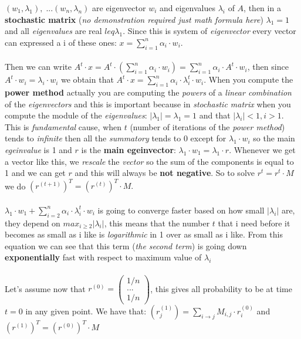 \documentclass{article}
\begin{document}
$(w_1, \lambda_1),\; ... (w_n, \lambda_n)$ are eigenvector $w_i$ and eigenvalues $\lambda_i$ of $A$, then in a \textbf{stochastic matrix} (\emph{no demonstration required just math formula here}) $\lambda_1 = 1$ and all \emph{eigenvalues} are real $leq \lambda_1$. Since this is system of \emph{eigenvector} every vector can expressed a i of these ones: $x = \sum_{i=1}^{n} \alpha_i \cdot w_i$. \\\\
Then we can write $A^t \cdot x = A^t \cdot (\sum_{i=1}^{n} \alpha_i \cdot w_i) = \sum_{i=1}^{n} \alpha_i \cdot A^t \cdot w_i$, then since $A^t \cdot w_i = \lambda_i \cdot w_i$ we obtain that $A^t \cdot x = \sum_{i=1}^{n} \alpha_i \cdot \lambda_i^t \cdot w_i$. When you compute the \textbf{power method} actually you are computing the \emph{powers} of a \emph{linear combination} of the \emph{eigenvectors} and this is important because in \emph{stochastic matrix} when you compute the module of the \emph{eigenvalues}: $|\lambda_1| = \lambda_1 = 1$ and that $|\lambda_i|<1, i>1$. This is \emph{fundamental} cause, when $t$ (number of iterations of the\emph{ power method}) tends to \emph{infinite} then all the \emph{summatory} tends to 0 except for $\lambda_1 \cdot w_i$ so the main \emph{egeinvalue} is 1 and $r$ is the\textbf{ main egeinvector}: $\lambda_1\cdot w_1 = \lambda_1 \cdot r$. Whenever we get a vector like this, we \emph{rescale} the \emph{vector} so the sum of the components is equal to 1 and we can get $r$ and this will always be \textbf{not negative}. So to solve $r^t = r^t \cdot M$ we do $(r^{(t+1)})^T = (r^{(t)})^T \cdot M.$\\\\
$\lambda_1 \cdot w_1 + \sum_{i=2}^{n} \alpha_i \cdot \lambda_i^t \cdot w_i$ is going to converge faster based on how small $|\lambda_i|$ are, they depend on $max_{i \geq 2}|\lambda_i|$, this means that the number $t$ that i need before it becomes as small as i like is \emph{logarithmic} in 1 over as small as i like. From this equation we can see that this term (\emph{the second term}) is going down \textbf{exponentially} fast with respect to maximum value of $\lambda_i$\\\\
Let's assume now that $r^{(0)} = \begin{pmatrix} 1/n\\ ...\\ 1/n \end{pmatrix}$, this gives all probability to be at time $t=0$ in any given point. We have that: $(r_j^{(1)}) = \sum_{i \rightarrow j} M_{i,j} \cdot r_i^{(0)}$ and $(r^{(1)})^T = (r^{(0)})^T \cdot M$\\
\end{document}
